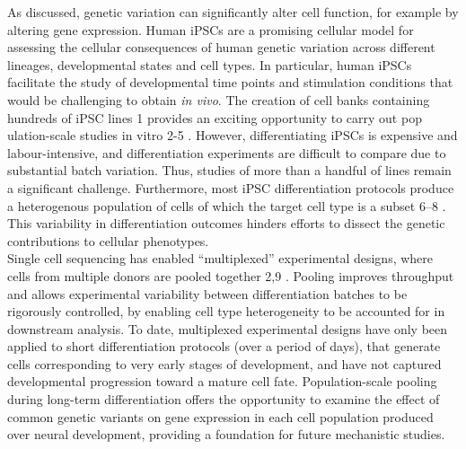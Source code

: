 As discussed, genetic variation can significantly alter cell function, for example by altering gene expression. 
Human iPSCs are a promising cellular model for assessing the cellular consequences of human genetic variation across different lineages, developmental states and cell types. 
In particular, human iPSCs facilitate the study of developmental time points and stimulation conditions that would be challenging to obtain \textit{in vivo}. 
The creation of cell banks containing hundreds of iPSC lines 1 provides an exciting opportunity to carry out pop ulation-scale studies in vitro 2-5 \cite{cuomo2020single, strober2019dynamic, schwartzentruber2018molecular, alasoo2018shared}.
However, differentiating iPSCs is expensive and labour-intensive, and differentiation experiments are difficult to compare due to substantial batch variation. 
Thus, studies of more than a handful of lines remain a significant challenge.
Furthermore, most iPSC differentiation protocols produce a heterogenous population of cells of which the target cell type is a subset 6–8 \cite{d2019vitro, banovich2018impact, volpato2018reproducibility, nguyen2018single}. 
This variability in differentiation outcomes hinders efforts to dissect the genetic contributions to cellular phenotypes.\\

Single cell sequencing has enabled “multiplexed” experimental designs, where cells from multiple donors are pooled together 2,9 \cite{cuomo2020single, nguyen2018single}. 
Pooling improves throughput and allows experimental variability between differentiation batches to be rigorously controlled, by enabling cell type heterogeneity to be accounted for in downstream analysis. 
To date, multiplexed experimental designs have only been applied to short differentiation protocols (over a period of days), that generate cells corresponding to very early stages of development, and have not captured developmental progression toward a mature cell fate. 
Population-scale pooling during long-term differentiation offers the opportunity to examine the effect of common genetic variants on gene expression in each cell population produced over neural development, providing a foundation for future mechanistic studies.

